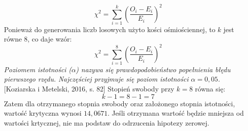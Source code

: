\begin{displaymath}
    \chi^2 = \sum_{i=1}^{k} \left( \frac{O_i - E_i}{E_i} \right)^2
\end{displaymath}
Ponieważ do generowania liczb losowych użyto kości ośmiościennej, to \begin{math} k \end{math} jest równe 8, co daje wzór:
\begin{displaymath}
    \chi^2 = \sum^{8}_{i=1} \left( \frac{O_i - E_i}{E_i} \right)^2
\end{displaymath}
\textit{Poziomem istotności (\begin{math} \alpha \end{math}) nazywa się prawdopodobieństwo popełnienia błędu pierwszego rzędu. Najczęściej przyjmuje się
poziom istotności \begin{math} \alpha = 0{,}05\end{math}.} [Koziarska i Metelski, 2016, s. 82]
Stopień swobody przy \begin{math} k = 8 \end{math} równa się:
\begin{displaymath}
    k - 1 = 8 - 1 = 7
\end{displaymath}
Zatem dla otrzymanego stopnia swobody oraz założonego stopnia istotności, wartość krytyczna wynosi \begin{math} 14,0671 \end{math}.
Jeśli otrzymana wartość będzie mniejsza od wartości krtycznej, nie ma podstaw do odrzucenia hipotezy zerowej.
